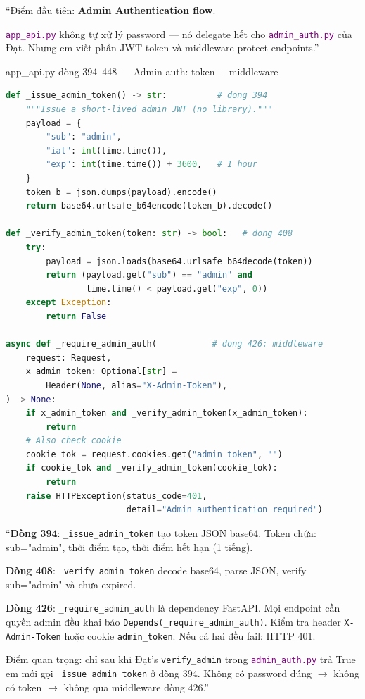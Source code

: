 \documentclass[12pt, a4paper]{article}
\newcommand{\fpath}[1]{\texttt{\textcolor{purple}{#1}}}
\begin{document}
\begin{say}
``Điểm đầu tiên: \textbf{Admin Authentication flow}.

\fpath{app\_api.py} không tự xử lý password --- nó delegate hết cho \fpath{admin\_auth.py} của Đạt.
Nhưng em viết phần JWT token và middleware protect endpoints.''
\end{say}

\begin{code}{app\_api.py dòng 394--448 --- Admin auth: token + middleware}
\begin{lstlisting}[language=Python, firstnumber=394]
def _issue_admin_token() -> str:          # dong 394
    """Issue a short-lived admin JWT (no library)."""
    payload = {
        "sub": "admin",
        "iat": int(time.time()),
        "exp": int(time.time()) + 3600,   # 1 hour
    }
    token_b = json.dumps(payload).encode()
    return base64.urlsafe_b64encode(token_b).decode()

def _verify_admin_token(token: str) -> bool:   # dong 408
    try:
        payload = json.loads(base64.urlsafe_b64decode(token))
        return (payload.get("sub") == "admin" and
                time.time() < payload.get("exp", 0))
    except Exception:
        return False

async def _require_admin_auth(           # dong 426: middleware
    request: Request,
    x_admin_token: Optional[str] =
        Header(None, alias="X-Admin-Token"),
) -> None:
    if x_admin_token and _verify_admin_token(x_admin_token):
        return
    # Also check cookie
    cookie_tok = request.cookies.get("admin_token", "")
    if cookie_tok and _verify_admin_token(cookie_tok):
        return
    raise HTTPException(status_code=401,
                        detail="Admin authentication required")
\end{lstlisting}
\end{code}

\begin{say}
``\textbf{Dòng 394}: \texttt{\_issue\_admin\_token} tạo token JSON base64.
Token chứa: sub="admin", thời điểm tạo, thời điểm hết hạn (1 tiếng).

\textbf{Dòng 408}: \texttt{\_verify\_admin\_token} decode base64, parse JSON,
verify sub="admin" và chưa expired.

\textbf{Dòng 426}: \texttt{\_require\_admin\_auth} là dependency FastAPI.
Mọi endpoint cần quyền admin đều khai báo \texttt{Depends(\_require\_admin\_auth)}.
Kiểm tra header \texttt{X-Admin-Token} hoặc cookie \texttt{admin\_token}.
Nếu cả hai đều fail: HTTP 401.

Điểm quan trọng: chỉ sau khi Đạt's \texttt{verify\_admin} trong \fpath{admin\_auth.py}
trả True em mới gọi \texttt{\_issue\_admin\_token} ở dòng 394.
Không có password đúng $\to$ không có token $\to$ không qua middleware dòng 426.''
\end{say}
\end{document}
